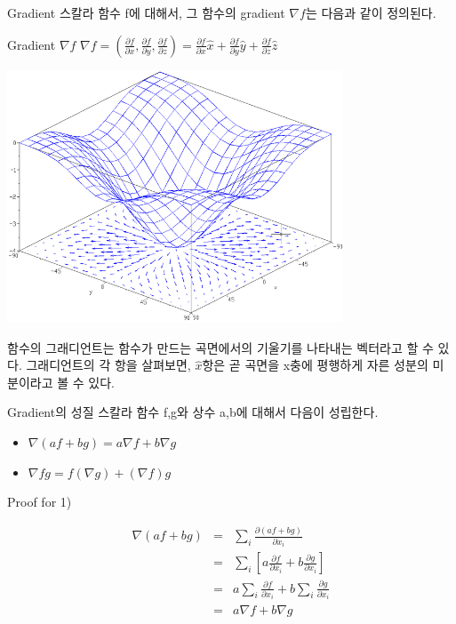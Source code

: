 \documentclass{beamer}
\begin{document}
\begin{frame}[allowframebreaks]{Gradient}
스칼라 함수 f에 대해서, 그 함수의 gradient $\nabla f$는 다음과 같이 정의된다. 
\begin{block}{Gradient $\nabla f$} 
$\nabla f = (\frac{\partial f}{\partial x}, \frac{\partial f}{\partial y},\frac{\partial f}{\partial z}) = \frac{\partial f}{\partial x} \hat{x} + \frac{\partial f}{\partial y} \hat{y} + \frac{\partial f}{\partial z} \hat{z}$
\end{block}

\includegraphics[width=10cm,keepaspectratio]{gradient}

함수의 그래디언트는 함수가 만드는 곡면에서의 기울기를 나타내는 벡터라고 할 수 있다. 그래디언트의 각 항을 살펴보면, $\hat{x}$항은 곧 곡면을 x충에 평행하게 자른 성분의 미분이라고 볼 수 있다. 
\end{frame} 

\begin{frame}{Gradient의 성질} 
스칼라 함수 f,g와 상수 a,b에 대해서 다음이 성립한다. 
\begin{itemize} 
\item $\nabla (af+bg) = a\nabla f + b \nabla g$ 
\item $\nabla fg = f (\nabla g) + (\nabla f) g$
\end{itemize}
\end{frame}

\begin{frame}{Proof for 1)} 

\begin{eqnarray} 
\nabla (af+bg)&=& \sum_i \frac{\partial (af+bg)}{\partial x_i} \\ 
&=& \sum_i [ a\frac{\partial f}{\partial x_i} +  b\frac{\partial g}{\partial x_i} ]\\
&=& a \sum_i \frac{\partial f}{\partial x_i} +  b \sum_i \frac{\partial g}{\partial x_i}  \\ 
&=& a \nabla f + b \nabla g
\end{eqnarray}



\end{frame} 
\end{document}
